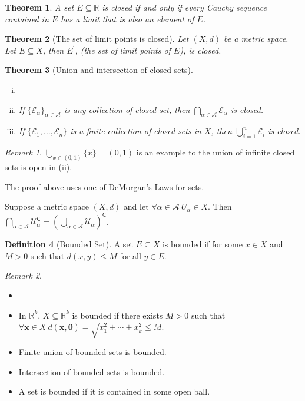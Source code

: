 \documentclass[12pt, lettersize]{book}
\theoremstyle{plain}
\newtheorem{thm}{Theorem}[section]
\theoremstyle{definition}
\newtheorem{dfn}[thm]{Definition}
\theoremstyle{remark}
\newtheorem*{rem}{Remark}
\newcommand{\R}{\mathbb{R}}
\newcommand{\com}{\mathsf{C}}
\begin{document}
	\begin{thm}
		A set $E\subseteq \R$ is closed if and only if every Cauchy sequence contained in $E$ has a limit that is also an element of $E$.
	\end{thm}
	
	\begin{thm}[The set of limit points is closed]
		Let $(X,d)$ be a metric space. Let $E\subseteq X$, then $E^\prime$, (the set of limit points of $E$), is closed.
	\end{thm}
	
	\begin{thm}[Union and intersection of closed sets]
		\begin{enumerate}[(i)]
			\item[]
			\item If $\{\mathcal{E}_\alpha\}_{\alpha\in\mathcal{A}}$ is any collection of closed set, then $\bigcap_{\alpha\in\mathcal{A}}\mathcal{E}_\alpha$ is closed.
			\item If $\{\mathcal{E}_1,\dots,\mathcal{E}_n\}$ is a finite collection of closed sets in $X$, then $\bigcup_{i=1}^{n}\mathcal{E}_i$ is closed.
		\end{enumerate}
	\end{thm}
	\begin{rem}
		$\bigcup_{x\in(0,1)}\{x\}=(0,1)$ is an example to the union of infinite closed sets is open in (ii).
	\end{rem}
	\newpage
	
	The proof above uses one of DeMorgan's Laws for sets.
	\setcounter{equation}{0}
	\begin{tcolorbox}[title=\textbf{DeMorgan's Laws for sets}]
		Suppose a metric space $(X,d)$ and let $\forall\alpha\in\mathcal{A}\ U_\alpha\in X$. Then $\bigcap_{\alpha\in\mathcal{A}}\mathcal{U}_{\alpha}^{\com}=\left(\bigcup_{\alpha\in\mathcal{A}}\mathcal{U}_\alpha\right)^\com$.
	\end{tcolorbox}\medskip
	
	\begin{dfn}[Bounded Set]
		A set $E\subseteq X$ is bounded if for some $x\in X$ and $M>0$ such that $d(x,y)\leq M$ for all $y\in E$.
	\end{dfn}
	\begin{rem}
		\begin{itemize}
			\item[]
			\item In $\R^k$, $X\subseteq\R^k$ is bounded if there exists $M>0$ such that $\forall\mathbf{x}\in X\ d(\mathbf{x},\mathbf{0})=\sqrt{x_1^2+\cdots+x_k^2}\leq M$.
			\item Finite union of bounded sets is bounded.
			\item Intersection of bounded sets is bounded.
			\item A set is bounded if it is contained in some open ball.
		\end{itemize}
	\end{rem}
	
\end{document}
